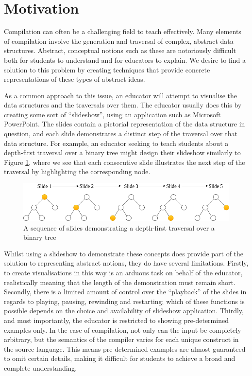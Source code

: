 \documentclass{l4proj}
\begin{document}
\section{Motivation}
Compilation can often be a challenging field to teach effectively. Many elements of compilation involve the generation and traversal of complex, abstract data structures. Abstract, conceptual notions such as these are notoriously difficult both for students to understand and for educators to explain. We desire to find a solution to this problem by creating techniques that provide concrete representations of these types of abstract ideas.

As a common approach to this issue, an educator will attempt to visualise the data structures and the traversals over them. The educator usually does this by creating some sort of ``slideshow'', using an application such as Microsoft PowerPoint. The slides contain a pictorial representation of the data structure in question, and each slide demonstrates a distinct step of the traversal over that data structure. For example, an educator seeking to teach students about a depth-first traversal over a binary tree might design their slideshow similarly to Figure \ref{fig:slideshow}, where we see that each consecutive slide illustrates the next step of the traversal by highlighting the corresponding node.

\begin{figure}
\centering
\includegraphics[scale=0.5]{images/slideshow.png}
\caption{A sequence of slides demonstrating a depth-first traversal over a binary tree}
\label{fig:slideshow}	
\end{figure}

Whilst using a slideshow to demonstrate these concepts does provide part of the solution to representing abstract notions, they do have several limitations. Firstly, to create visualisations in this way is an arduous task on behalf of the educator, realistically meaning that the length of the demonstration must remain short. Secondly, there is a limited amount of control over the “playback” of the slides in regards to playing, pausing, rewinding and restarting; which of these functions is possible depends on the choice and availability of slideshow application. Thirdly, and most importantly, the educator is restricted to showing pre-determined examples only. In the case of compilation, not only can the input be completely arbitrary, but the semantics of the compiler varies for each unique construct in the source language. This means pre-determined examples are almost guaranteed to omit certain details, making it difficult for students to achieve a broad and complete understanding.
\end{document}
